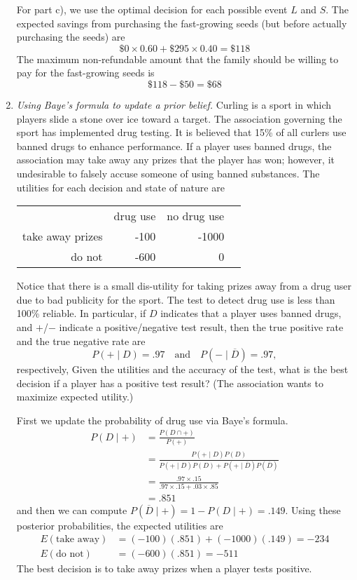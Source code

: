 \begin{enumerate}
\begin{solution}
For part c), we use the optimal decision for each possible event $L$ and $S$. 
The expected savings from purchasing the fast-growing seeds
(but before actually purchasing the seeds) are
\[ \$0 \times 0.60 + \$295 \times 0.40 = \$118 \]
The maximum non-refundable amount that the family should be willing 
to pay for the fast-growing seeds is
\[ \$118 - \$50 = \$68 \]
\end{solution}

\item \emph{Using Baye's formula to update a prior belief.}
Curling is a sport in which players slide a stone over ice toward a
target. The association governing the sport has implemented drug
testing. It is believed that 15\% of all curlers use banned drugs to
enhance performance. If a player uses banned drugs, the association
may take away any prizes that the player has won; however, it
undesirable to falsely accuse someone of using banned substances.  The
utilities for each decision and state of nature are

\begin{center}
\begin{tabular}{rrrr}
& drug use & no drug use \\ \cline{2-3}
take away prizes & -100 & -1000 \\
do not & -600 & 0 
\end{tabular}
\end{center}

Notice that there is a small dis-utility for taking prizes away from a drug user
due to bad publicity for the sport. The test to detect drug use is
less than 100\% reliable. In particular, if $D$ indicates that a 
player uses banned drugs, and $+$/$-$ indicate a positive/negative
test result, then the true positive rate and the true negative rate
are
\[
P(+ \mid D) = .97 \quad \text{and} \quad P(- \mid \overline{D}) = .97,
\]
respectively, Given the utilities and the accuracy of the test, what is the best
decision if a player has a positive test result? (The association
wants to maximize expected utility.)

\begin{solution}
\bs First we update the probability of drug use via Baye's formula.
\begin{align*}
P(D \mid +) &= \frac{P(D \cap +)}{P(+)} \\
&= \frac{P(+ \mid D)P(D)}{P(+ \mid D)P(D) + P(+ \mid \overline{D})P(\overline{D})} \\
&= \frac{.97 \times .15}{.97 \times .15 + .03 \times .85} \\
&= .851
\end{align*}
and then we can compute $P(\overline{D} \mid +) = 1 - P(D \mid +) = .149$.
Using these posterior probabilities, the expected utilities are
\begin{align*}
E(\text{take away}) &= (-100)(.851) + (-1000)(.149) = -234 \\
E(\text{do not}) &= (-600)(.851) = -511
\end{align*}
The best decision is to take away prizes when a player tests positive.
\end{solution}


\end{enumerate}
